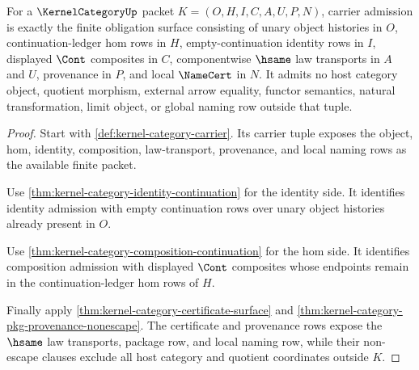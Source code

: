 \begin{theorem}
\label{thm:kernel-category-carrier-admission-obligation}
For a $\KernelCategoryUp$ packet $K=(O,H,I,C,A,U,P,N)$, carrier admission is
exactly the finite obligation surface consisting of unary object histories in
$O$, continuation-ledger hom rows in $H$, empty-continuation identity rows in
$I$, displayed $\Cont$ composites in $C$, componentwise $\hsame$ law transports
in $A$ and $U$, provenance in $P$, and local $\NameCert$ in $N$. It admits no
host category object, quotient morphism, external arrow equality, functor
semantics, natural transformation, limit object, or global naming row outside
that tuple.
\end{theorem}
\begin{proof}
Start with \autoref{def:kernel-category-carrier}. Its carrier tuple exposes
the object, hom, identity, composition, law-transport, provenance, and local
naming rows as the available finite packet.

Use \autoref{thm:kernel-category-identity-continuation} for the identity side.
It identifies identity admission with empty continuation rows over unary object
histories already present in $O$.

Use \autoref{thm:kernel-category-composition-continuation} for the hom side.
It identifies composition admission with displayed $\Cont$ composites whose
endpoints remain in the continuation-ledger hom rows of $H$.

Finally apply \autoref{thm:kernel-category-certificate-surface} and
\autoref{thm:kernel-category-pkg-provenance-nonescape}. The certificate and
provenance rows expose the $\hsame$ law transports, package row, and local
naming row, while their non-escape clauses exclude all host category and
quotient coordinates outside $K$.
\end{proof}

